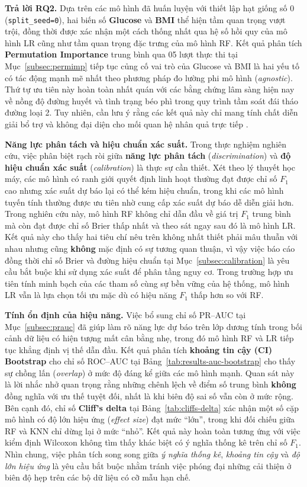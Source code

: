 \documentclass[14pt,a4paper]{extreport}
\begin{document}
\textbf{Trả lời RQ2.} Dựa trên các mô hình đã huấn luyện với thiết lập hạt giống số 0 (\texttt{split\_seed=0}), hai biến số \textbf{Glucose} và \textbf{BMI} thể hiện tầm quan trọng vượt trội, đồng thời được xác nhận một cách thống nhất qua hệ số hồi quy của mô hình LR cũng như tầm quan trọng đặc trưng của mô hình RF. Kết quả phân tích \textbf{Permutation Importance} trung bình qua 05 lượt thực thi tại Mục~\ref{subsec:permimp} tiếp tục củng cố vai trò của Glucose và BMI là hai yếu tố có tác động mạnh mẽ nhất theo phương pháp đo lường phi mô hình (\textit{agnostic}). Thứ tự ưu tiên này hoàn toàn nhất quán với các bằng chứng lâm sàng hiện nay về nồng độ đường huyết và tình trạng béo phì trong quy trình tầm soát đái tháo đường loại 2. Tuy nhiên, cần lưu ý rằng các kết quả này chỉ mang tính chất diễn giải bổ trợ và không đại diện cho mối quan hệ nhân quả trực tiếp \cite{kirbas2025shap,chang2022pima}.

\textbf{Năng lực phân tách và hiệu chuẩn xác suất.} Trong thực nghiệm nghiên cứu, việc phân biệt rạch ròi giữa \textbf{năng lực phân tách} (\textit{discrimination}) và \textbf{độ hiệu chuẩn xác suất} (\textit{calibration}) là thực sự cần thiết. Xét theo lý thuyết học máy, các mô hình có ranh giới quyết định linh hoạt thường đạt được chỉ số $F_1$ cao nhưng xác suất dự báo lại có thể kém hiệu chuẩn, trong khi các mô hình tuyến tính thường được ưu tiên nhờ cung cấp xác suất dự báo dễ diễn giải hơn. Trong nghiên cứu này, mô hình RF không chỉ dẫn đầu về giá trị $F_1$ trung bình mà còn đạt được chỉ số Brier thấp nhất và theo sát ngay sau đó là mô hình LR. Kết quả này cho thấy hai tiêu chí nêu trên không nhất thiết phải mâu thuẫn với nhau nhưng cũng \textbf{không} mặc định có sự tương quan thuận, vì vậy việc báo cáo đồng thời chỉ số Brier và đường hiệu chuẩn tại Mục~\ref{subsec:calibration} là yêu cầu bắt buộc khi sử dụng xác suất để phân tầng nguy cơ. Trong trường hợp ưu tiên tính minh bạch của các tham số cùng sự bền vững của hệ thống, mô hình LR vẫn là lựa chọn tối ưu mặc dù có hiệu năng $F_1$ thấp hơn so với RF.

\textbf{Tính ổn định của hiệu năng.} Việc bổ sung chỉ số PR--AUC tại Mục~\ref{subsec:prauc} đã giúp làm rõ năng lực dự báo trên lớp dương tính trong bối cảnh dữ liệu có hiện tượng mất cân bằng nhẹ, trong đó mô hình RF và LR tiếp tục khẳng định vị thế dẫn đầu. Kết quả phân tích \textbf{khoảng tin cậy (CI) Bootstrap} cho chỉ số ROC--AUC tại Bảng~\ref{tab:results-auc-bootstrap} cho thấy sự chồng lấn (\textit{overlap}) ở mức độ đáng kể giữa các mô hình mạnh. Quan sát này là lời nhắc nhở quan trọng rằng những chênh lệch về điểm số trung bình \textbf{không} đồng nghĩa với ưu thế tuyệt đối, nhất là khi biên độ sai số vẫn còn ở mức rộng. Bên cạnh đó, chỉ số \textbf{Cliff's delta} tại Bảng~\ref{tab:cliffs-delta} xác nhận một số cặp mô hình có độ lớn hiệu ứng (\textit{effect size}) đạt mức ``lớn'', trong khi đối chiếu giữa RF và KNN chỉ dừng lại ở mức ``nhỏ''. Kết quả này hoàn toàn tương ứng với việc kiểm định Wilcoxon không tìm thấy khác biệt có ý nghĩa thống kê trên chỉ số $F_1$. Nhìn chung, việc phân tích song song giữa \emph{ý nghĩa thống kê}, \emph{khoảng tin cậy} và \emph{độ lớn hiệu ứng} là yêu cầu bắt buộc nhằm tránh việc phóng đại những cải thiện ở biên độ hẹp trên các bộ dữ liệu có cỡ mẫu hạn chế.
\end{document}
